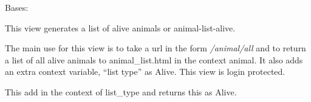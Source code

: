 \documentclass[letterpaper,10pt,english]{sphinxmanual}
\begin{document}

\begin{fulllineitems}
\label{api:mousedb.animal.views.AnimalListAlive}
Bases: {\hyperref[api:mousedb.animal.views.AnimalList]{}}

This view generates a list of alive animals or animal-list-alive.

The main use for this view is to take a url in the form \emph{/animal/all} and to return a list of all alive animals to animal\_list.html in the context animal.  It also adds an extra context variable, ``list type'' as Alive.  
This view is login protected.

\begin{fulllineitems}
\label{api:mousedb.animal.views.AnimalListAlive.get_context_data}
This add in the context of list\_type and returns this as Alive.

\end{fulllineitems}


\begin{fulllineitems}
\label{api:mousedb.animal.views.AnimalListAlive.queryset}
\end{fulllineitems}


\end{fulllineitems}

\end{document}
